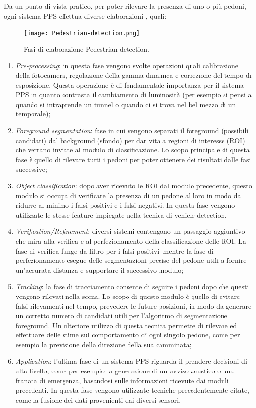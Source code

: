 Da un punto di vista pratico, per poter rilevare la presenza di uno o più 
pedoni, ogni sistema PPS effettua diverse elaborazioni \cite{pedestrian-detection}, quali:
\begin{figure}
    \centering
    \texttt{[image: Pedestrian-detection.png]}
    \centering
    \caption{Fasi di elaborazione Pedestrian detection.}
    \label{ped-det}
\end{figure}
\begin{enumerate}
    \item \emph{Pre-processing}: in questa fase vengono svolte operazioni quali calibrazione 
    della fotocamera, regolazione della gamma dinamica e correzione 
    del tempo di esposizione. Questa operazione è di fondamentale importanza 
    per il sistema PPS in quanto contrasta il cambiamento di 
    luminosità (per esempio si pensi a quando si intraprende un tunnel o 
    quando ci si trova nel bel mezzo di un temporale);
    \item \emph{Foreground segmentation}: fase in cui vengono separati il foreground 
    (possibili candidati) dal background (sfondo) per dar vita a regioni di 
    interesse (ROI) che verrano inviate al modulo di classificazione. Lo 
    scopo principale di questa fase è quello di rilevare tutti i pedoni per 
    poter ottenere dei risultati dalle fasi successive;
    \item \emph{Object classification}: dopo aver ricevuto le ROI dal modulo precedente, 
    questo modulo si occupa di verificare la presenza di un pedone al loro  
    in modo da ridurre al minimo i falsi positivi e i falsi negativi. In 
    questa fase vengono utilizzate le stesse feature impiegate nella tecnica 
    di vehicle detection. 
    \item \emph{Verification/Refinement}: diversi sistemi contengono un passaggio aggiuntivo 
    che mira alla verifica e al perfezionamento della classificazione 
    delle ROI. La fase di verifica funge da filtro per i falsi positivi, mentre 
    la fase di perfezionamento esegue delle segmentazioni precise del 
    pedone utili a fornire un'accurata distanza e supportare il successivo 
    modulo;
    \item \emph{Tracking}: la fase di tracciamento consente di seguire i pedoni dopo che 
    questi vengono rilevati nella scena. Lo scopo di questo modulo è quello 
    di evitare falsi rilevamenti nel tempo, prevedere le future posizioni, in 
    modo da generare un corretto numero di candidati utili per l'algoritmo 
    di segmentazione foreground. Un ulteriore utilizzo di questa tecnica 
    permette di rilevare ed effettuare delle stime sul comportamento di 
    ogni singolo pedone, come per esempio la previsione della direzione 
    della sua camminata;
    \item \emph{Application}: l'ultima fase di un sistema PPS riguarda il prendere 
    decisioni di alto livello, come per esempio la generazione di un avviso 
    acustico o una franata di emergenza, basandosi sulle informazioni 
    ricevute dai moduli precedenti. In questa fase vengono utilizzate 
    tecniche precedentemente citate, come la fusione dei dati provenienti 
    dai diversi sensori.
\end{enumerate}
